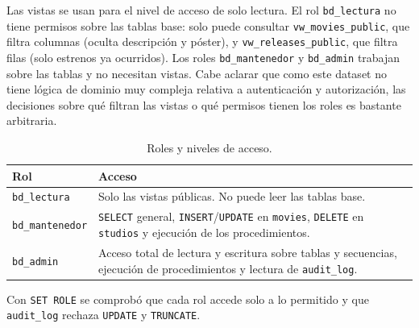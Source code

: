 \documentclass[11pt,a4paper]{article}
\begin{document}
Las vistas se usan para el nivel de acceso de solo lectura. El rol
\texttt{bd\_lectura} no tiene permisos sobre las tablas base: solo puede
consultar \texttt{vw\_movies\_public}, que filtra columnas (oculta descripción y
póster), y \texttt{vw\_releases\_public}, que filtra filas (solo estrenos ya
ocurridos). Los roles \texttt{bd\_mantenedor} y \texttt{bd\_admin} trabajan
sobre las tablas y no necesitan vistas. Cabe aclarar que como este dataset
no tiene lógica de dominio muy compleja relativa a autenticación y autorización,
las decisiones sobre qué filtran las vistas o qué permisos tienen los roles es
bastante arbitraria.

\begin{table}[htbp]
    \centering
    \begin{tabular}{l p{9.5cm}}
        \hline
        Rol & Acceso \\
        \hline
        \texttt{bd\_lectura} &
        Solo las vistas públicas. No puede leer las tablas base. \\
        \texttt{bd\_mantenedor} &
        \texttt{SELECT} general, \texttt{INSERT}/\texttt{UPDATE} en
        \texttt{movies}, \texttt{DELETE} en \texttt{studios} y ejecución de los
        procedimientos. \\
        \texttt{bd\_admin} &
        Acceso total de lectura y escritura sobre tablas y secuencias, ejecución
        de procedimientos y lectura de \texttt{audit\_log}. \\
        \hline
    \end{tabular}
    \caption{Roles y niveles de acceso.}
    \label{tab:roles}
\end{table}

Con \texttt{SET ROLE} se comprobó que cada rol accede solo a lo permitido y que
\texttt{audit\_log} rechaza \texttt{UPDATE} y \texttt{TRUNCATE}.
\end{document}
